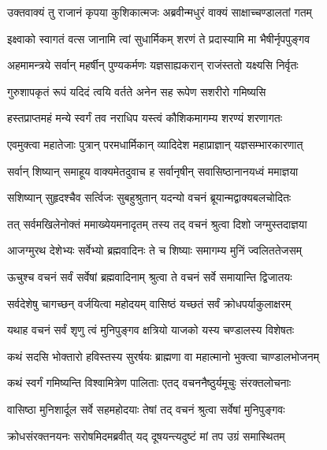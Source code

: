 
\twolineshloka
{उक्तवाक्यं तु राजानं कृपया कुशिकात्मजः}
{अब्रवीन्मधुरं वाक्यं साक्षाच्चण्डालतां गतम्} %

\twolineshloka
{इक्ष्वाको स्वागतं वत्स जानामि त्वां सुधार्मिकम्}
{शरणं ते प्रदास्यामि मा भैषीर्नृपपुङ्गव} %

\twolineshloka
{अहमामन्त्रये सर्वान् महर्षीन् पुण्यकर्मणः}
{यज्ञसाह्यकरान् राजंस्ततो यक्ष्यसि निर्वृतः} %

\twolineshloka
{गुरुशापकृतं रूपं यदिदं त्वयि वर्तते}
{अनेन सह रूपेण सशरीरो गमिष्यसि} %

\twolineshloka
{हस्तप्राप्तमहं मन्ये स्वर्गं तव नराधिप}
{यस्त्वं कौशिकमागम्य शरण्यं शरणागतः} %

\twolineshloka
{एवमुक्त्वा महातेजाः पुत्रान् परमधार्मिकान्}
{व्यादिदेश महाप्राज्ञान् यज्ञसम्भारकारणात्} %

\twolineshloka
{सर्वान् शिष्यान् समाहूय वाक्यमेतदुवाच ह}
{सर्वानृषीन् सवासिष्ठानानयध्वं ममाज्ञया} %

\twolineshloka
{सशिष्यान् सुहृदश्चैव सर्त्विजः सुबहुश्रुतान्}
{यदन्यो वचनं ब्रूयान्मद्वाक्यबलचोदितः} %

\twolineshloka
{तत् सर्वमखिलेनोक्तं ममाख्येयमनादृतम्}
{तस्य तद् वचनं श्रुत्वा दिशो जग्मुस्तदाज्ञया} %

\twolineshloka
{आजग्मुरथ देशेभ्यः सर्वेभ्यो ब्रह्मवादिनः}
{ते च शिष्याः समागम्य मुनिं ज्वलिततेजसम्} %

\twolineshloka
{ऊचुश्च वचनं सर्वं सर्वेषां ब्रह्मवादिनाम्}
{श्रुत्वा ते वचनं सर्वे समायान्ति द्विजातयः} %

\twolineshloka
{सर्वदेशेषु चागच्छन् वर्जयित्वा महोदयम्}
{वासिष्ठं यच्छतं सर्वं क्रोधपर्याकुलाक्षरम्} %

\twolineshloka
{यथाह वचनं सर्वं शृणु त्वं मुनिपुङ्गव}
{क्षत्रियो याजको यस्य चण्डालस्य विशेषतः} %

\twolineshloka
{कथं सदसि भोक्तारो हविस्तस्य सुरर्षयः}
{ब्राह्मणा वा महात्मानो भुक्त्वा चाण्डालभोजनम्} %

\twolineshloka
{कथं स्वर्गं गमिष्यन्ति विश्वामित्रेण पालिताः}
{एतद् वचननैष्ठुर्यमूचुः संरक्तलोचनाः} %

\twolineshloka
{वासिष्ठा मुनिशार्दूल सर्वे सहमहोदयाः}
{तेषां तद् वचनं श्रुत्वा सर्वेषां मुनिपुङ्गवः} %

\twolineshloka
{क्रोधसंरक्तनयनः सरोषमिदमब्रवीत्}
{यद् दूषयन्त्यदुष्टं मां तप उग्रं समास्थितम्} %

